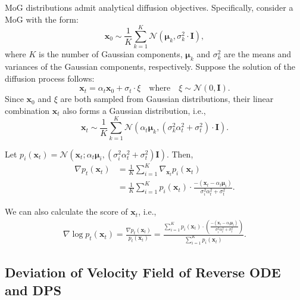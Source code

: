\documentclass{article}
\theoremstyle{plain}
\theoremstyle{definition}
\theoremstyle{remark}
\def\vmu{{\bm{\mu}}}
\def\vx{{\bm{x}}}
\def\vmu{{\bm{\mu}}}
\def\mI{{\bm{I}}}
\begin{document}
MoG distributions admit analytical diffusion objectives. Specifically, consider a MoG with the form:
\begin{equation*}
\bm{x}_{0} \sim \frac{1}{K} \sum_{k=1}^K  \mathcal{N}(\vmu_k, \sigma_k^2\cdot \mI),
\end{equation*}
where $K$ is the number of Gaussian components, $\vmu_k$ and $\sigma_k^2$ are the means and variances of the Gaussian components, respectively.
Suppose the solution of the diffusion process follows:
\begin{equation*}
\vx_t = \alpha_t\vx_0+ \sigma_t\cdot \xi \quad \mathrm{where} \quad \xi \sim \mathcal{N}(0, \bm{I}).
\end{equation*}
Since $\vx_0$ and $\xi$ are both sampled from Gaussian distributions, their linear combination $\vx_t$ also forms a Gaussian distribution, i.e.,
\begin{equation*}
    \bm{x}_t \sim \frac{1}{K}\sum_{k=1}^K  \mathcal{N}(\alpha_t\vmu_k , (\sigma_k^2\alpha_t^2+ \sigma_t^2)\cdot \bm{I}).
\end{equation*}

Let \(p_i(\vx_t)=\mathcal{N}(\vx_t;\alpha_t\vmu_i,(\sigma_i^2\alpha_t^2+\sigma_t^2)\bm I)\). Then,
\begin{equation*}
\begin{aligned}
\nabla p_t(\vx_t)
&= \frac{1}{K}\sum_{i=1}^{K} \nabla_{\vx_t} p_i(\vx_t)\\
&= \frac{1}{K}\sum_{i=1}^{K} p_i(\vx_t)\cdot
\frac{-(\vx_t-\alpha_t\vmu_i)}{\sigma_i^2\alpha_t^2+\sigma_t^2}.
\end{aligned}
\end{equation*}

We can also calculate the score of $\vx_t$, i.e.,
\begin{equation*}
\begin{aligned}
\nabla \log p_t(\vx_t)
=\frac{\nabla p_t(\vx_t)}{p_t(\vx_t)}
= \frac{\sum_{i=1}^{K} p_i(\vx_t)\cdot
\left(\frac{-(\vx_t-\alpha_t\vmu_i)}{\sigma_i^2\alpha_t^2+\sigma_t^2}\right)}
{\sum_{i=1}^{K} p_i(\vx_t)}.
\end{aligned}
\end{equation*}
\subsection{Deviation of Velocity Field of Reverse ODE and DPS}\label{appendix:devi-velocity}
\end{document}
